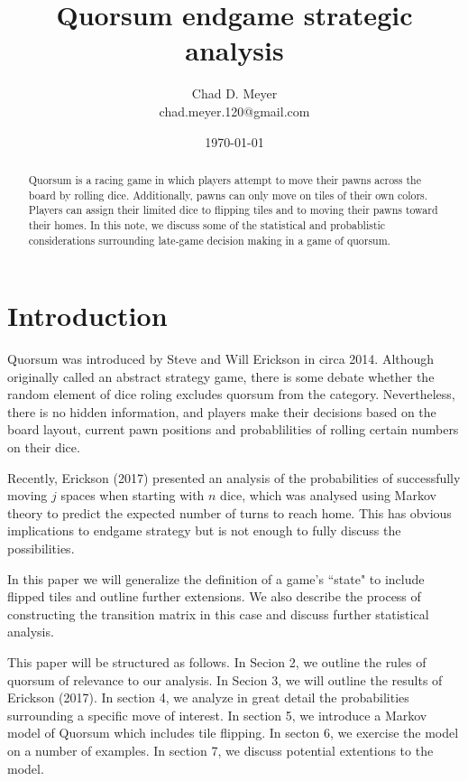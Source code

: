 \documentclass[letterpaper,11pt]{article}
\begin{document}
\title{Quorsum endgame strategic analysis}
\author{Chad D. Meyer \\ chad.meyer.120@gmail.com}
\date{\today}
\maketitle

\begin{abstract}
Quorsum is a racing game in which players attempt to move their pawns across
the board by rolling dice.  Additionally, pawns can only move on tiles of
their own colors.  Players can assign their limited dice to flipping tiles
and to moving their pawns toward their homes.  In this note, we discuss some
of the statistical and probablistic considerations surrounding late-game
decision making in a game of quorsum.
\end{abstract}

\section{Introduction}
Quorsum was introduced by Steve and Will Erickson in circa 2014.  Although
originally called an abstract strategy game, there is some debate whether the
random element of dice roling excludes quorsum from the category.  Nevertheless,
there is no hidden information, and players make their decisions based on the
board layout, current pawn positions and probablilities of rolling certain
numbers on their dice.

Recently, Erickson (2017) presented an analysis of the probabilities of
successfully moving $j$ spaces when starting with $n$ dice, which was analysed
using Markov theory to predict the expected number of turns to reach home.  This
has obvious implications to endgame strategy but is not enough to fully discuss
the possibilities.

In this paper we will generalize the definition of a game's ``state" to include
flipped tiles and outline further extensions.  We also describe the process of
constructing the transition matrix in this case and discuss further statistical
analysis.

This paper will be structured as follows.  In Secion 2, we outline the rules of
quorsum of relevance to our analysis.  In Secion 3, we will outline the results
of Erickson (2017).  In section 4, we analyze in great detail the probabilities
surrounding a specific move of interest.  In section 5, we introduce a Markov
model of Quorsum which includes tile flipping.  In secton 6, we exercise the
model on a number of examples.  In section 7, we discuss potential extentions
to the model.
\end{document}
